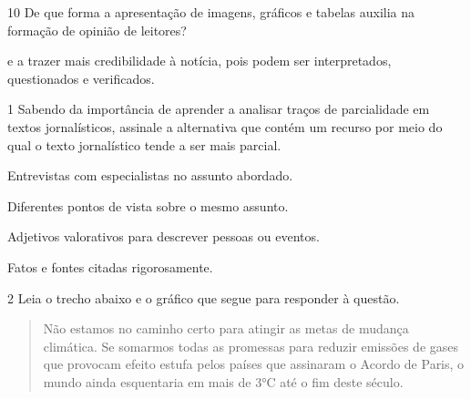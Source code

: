 {{

\num{10} De que forma a apresentação de imagens, gráficos e tabelas auxilia 
na formação de opinião de leitores?
  
e  a trazer mais credibilidade à notícia, pois podem ser interpretados, 
questionados e verificados.}


\num{1} Sabendo da importância de aprender a analisar traços de parcialidade em
textos jornalísticos, assinale a alternativa que contém um recurso por meio
do qual o texto jornalístico tende a ser mais parcial.

\begin{escolha}

  \item Entrevistas com especialistas no assunto abordado.
  \item Diferentes pontos de vista sobre o mesmo assunto.
  \item Adjetivos valorativos para descrever pessoas ou eventos.
  \item Fatos e fontes citadas rigorosamente. 

\end{escolha}


\num{2} Leia o trecho abaixo e o gráfico que segue para responder à questão.

\begin{quote}

Não estamos no caminho certo para atingir as metas de mudança
climática. Se somarmos todas as promessas para reduzir emissões de gases
que provocam efeito estufa pelos países que assinaram o Acordo de Paris,
o mundo ainda esquentaria em mais de 3°C até o fim deste século.


\end{quote}}
